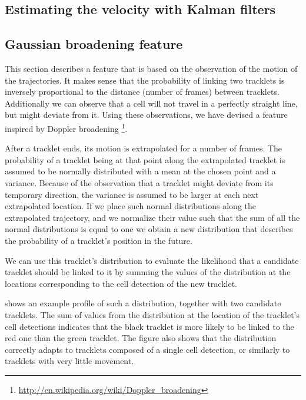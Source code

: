     	\subsection{Estimating the velocity with Kalman filters \statusnew}
    		\notyetimplemented{}
    	\subsection{Gaussian broadening feature \statusfirstdraft}
    		\label{sec:gaussianbroadening}
    		This section describes a feature that is based on the observation of the motion of the trajectories. It makes sense that the probability of linking two tracklets is inversely proportional to the distance (number of frames) between tracklets. Additionally we can observe that a cell will not travel in a perfectly straight line, but might deviate from it. Using these observations, we have devised a feature inspired by Doppler broadening \footnote{\url{http://en.wikipedia.org/wiki/Doppler_broadening}}.
    		
    		After a tracklet ends, its motion is extrapolated for a number of frames. The probability of a tracklet being at that point along the extrapolated tracklet is assumed to be normally distributed with a mean at the chosen point and a variance. Because of the observation that a tracklet might deviate from its temporary direction, the variance is assumed to be larger at each next extrapolated location. If we place such normal distributions along the extrapolated trajectory, and we normalize their value such that the sum of all the normal distributions is equal to one we obtain a new distribution that describes the probability of a tracklet's position in the future.
    		
    		We can use this tracklet's distribution to evaluate the likelihood that a candidate tracklet should be linked to it by summing the values of the distribution at the locations corresponding to the cell detection of the new tracklet.
    		
    		 shows an example profile of such a distribution, together with two candidate tracklets. The sum of values from the distribution at the location of the tracklet's cell detections indicates that the black tracklet is more likely to be linked to the red one than the green tracklet. The figure also shows that the distribution correctly adapts to tracklets composed of a single cell detection, or similarly to tracklets with very little movement.
	

